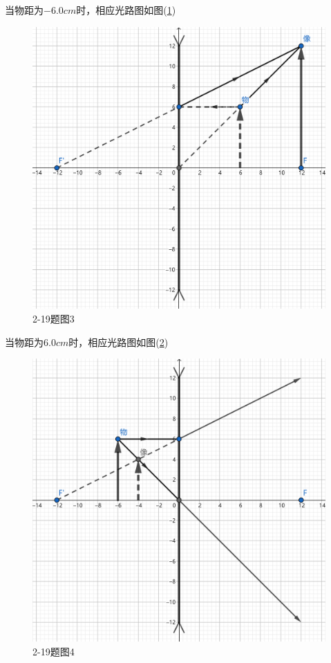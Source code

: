 \documentclass[10pt,a4paper]{article}
\theoremstyle{remark}
\begin{document}
当物距为$-6.0cm$时，相应光路图如图(\ref{FigureofProblem2-19_3})
\begin{figure}
\centering
\includegraphics[scale=.2]{OpticsHomework_2_2-19_3(tailored).png}
\caption{2-19题图3}\label{FigureofProblem2-19_3}
\end{figure}

当物距为$6.0cm$时，相应光路图如图(\ref{FigureofProblem2-19_4})
\begin{figure}
\centering
\includegraphics[scale=.2]{OpticsHomework_2_2-19_4(tailored).png}
\caption{2-19题图4}\label{FigureofProblem2-19_4}
\end{figure}
\end{document}
